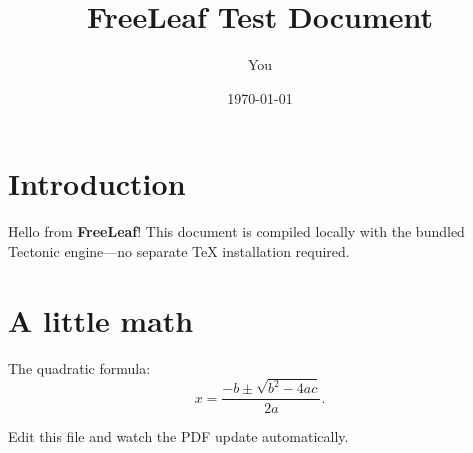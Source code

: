 \documentclass{article}
\title{FreeLeaf Test Document}
\author{You}
\date{\today}
\begin{document}
\maketitle

\section{Introduction}
Hello from \textbf{FreeLeaf}! This document is compiled locally with the bundled
Tectonic engine---no separate TeX installation required.

\section{A little math}
The quadratic formula:
\begin{equation}
  x = \frac{-b \pm \sqrt{b^2 - 4ac}}{2a}.
\end{equation}

Edit this file and watch the PDF update automatically.
\end{document}
